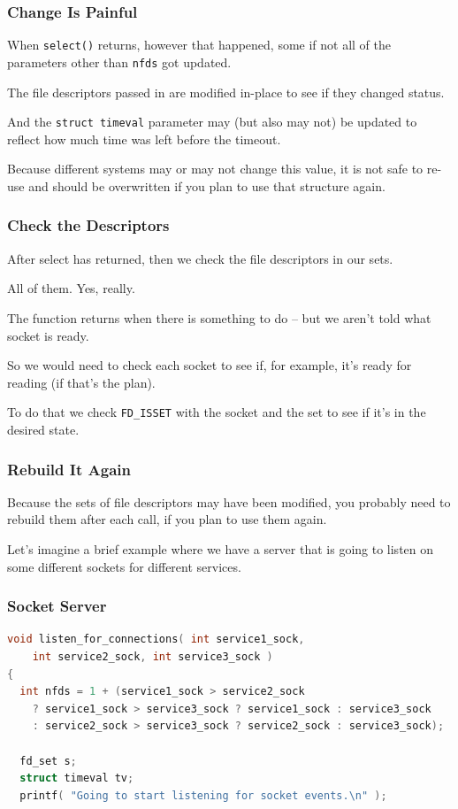 \begin{frame}
	\frametitle{Change Is Painful}

	When \texttt{select()} returns, however that happened, some if not all of the parameters other than \texttt{nfds} got updated.

	The file descriptors passed in are modified in-place to see if they changed status.

	And the \texttt{struct timeval} parameter may (but also may not) be updated to reflect how much time was left before the timeout.

	Because different systems may or may not change this value, it is not safe to re-use and should be overwritten if you plan to use that structure again.

\end{frame}


\begin{frame}
	\frametitle{Check the Descriptors}

	After select has returned, then we check the file descriptors in our sets.

	All of them. Yes, really.

	The function returns when there is something to do -- but we aren't told what socket is ready.

	So we would need to check each socket to see if, for example, it's ready for reading (if that's the plan).

	To do that we check \texttt{FD\_ISSET} with the socket and the set to see if it's in the desired state.

\end{frame}

\begin{frame}
	\frametitle{Rebuild It Again}

	Because the sets of file descriptors may have been modified, you probably need to rebuild them after each call, if you plan to use them again.

	Let's imagine a brief example where we have a server that is going to listen on some different sockets for different services.

\end{frame}


\begin{frame}[fragile]
	\frametitle{Socket Server}

	\begin{lstlisting}[language=C]
void listen_for_connections( int service1_sock, 
    int service2_sock, int service3_sock ) 
{
  int nfds = 1 + (service1_sock > service2_sock
    ? service1_sock > service3_sock ? service1_sock : service3_sock
    : service2_sock > service3_sock ? service2_sock : service3_sock);
    
  fd_set s;
  struct timeval tv;
  printf( "Going to start listening for socket events.\n" );
\end{lstlisting}

\end{frame}

